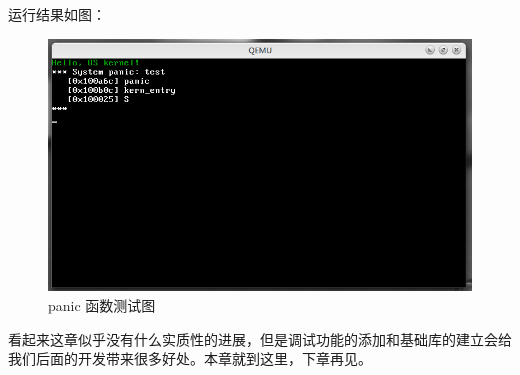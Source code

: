 \par 运行结果如图：

\begin{figure}[ht]
      \centering
      \includegraphics[scale=0.4]{picture/chapt5/os_panic.png}
      \caption{panic 函数测试图}
\end{figure}

\par 看起来这章似乎没有什么实质性的进展，但是调试功能的添加和基础库的建立会给我们后面的开发带来很多好处。本章就到这里，下章再见。
